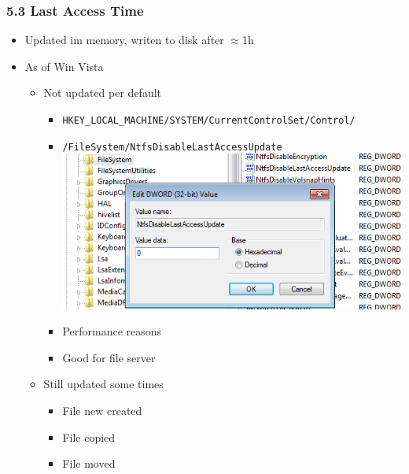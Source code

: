 \begin{frame}[fragile]
\frametitle{5.3 Last Access Time}
    \begin{itemize}
        \item Updated im memory, writen to disk after $\approx$1h
        \item As of Win Vista
        \begin{itemize}
            \item Not updated per default
            \begin{itemize}
		\item \texttt{\footnotesize HKEY\_LOCAL\_MACHINE/SYSTEM/CurrentControlSet/Control/}
		\item[] \texttt{\footnotesize /FileSystem/NtfsDisableLastAccessUpdate}
			\includegraphics[scale=0.25]{images/lastAccess.png}
                \item Performance reasons
                \item Good for file server
            \end{itemize}
            \item Still updated some times
            \begin{itemize}
                \item File new created
                \item File copied
                \item File moved
            \end{itemize}
        \end{itemize}
    \end{itemize}
\end{frame}



